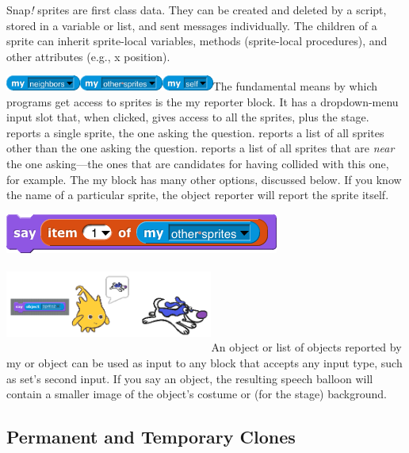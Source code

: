 Snap\emph{!} sprites are ﬁrst class data. They can be created and
deleted by a script, stored in a variable or list, and sent messages
individually. The children of a sprite can inherit sprite-local
variables, methods (sprite-local procedures), and other attributes
(e.g., x position).

\includegraphics[width=0.96528in,height=0.19444in]{media/image743.png}\includegraphics[width=1.08333in,height=0.19444in]{media/image744.png}\includegraphics[width=0.66667in,height=0.19444in]{media/image745.png}The
fundamental means by which programs get access to sprites is the my
reporter block. It has a dropdown-menu input slot that, when clicked,
gives access to all the sprites, plus the stage. reports a single
sprite, the one asking the question. reports a list of all sprites other
than the one asking the question. reports a list of all sprites that are
\emph{near} the one asking---the ones that are candidates for having
collided with this one, for example. The my block has many other
options, discussed below. If you know the name of a particular sprite,
the object reporter will report the sprite itself.

\includegraphics[width=3.55208in,height=0.51042in]{media/image746.png}\includegraphics[width=2.69143in,height=1.25in]{media/image747.png}An
object or list of objects reported by my or object can be used as input
to any block that accepts any input type, such as set's second input. If
you say an object, the resulting speech balloon will contain a smaller
image of the object's costume or (for the stage) background.

\subsection{\texorpdfstring{ Permanent and Temporary
Clones}{ Permanent and Temporary Clones}}\label{permanent-and-temporary-clones}

